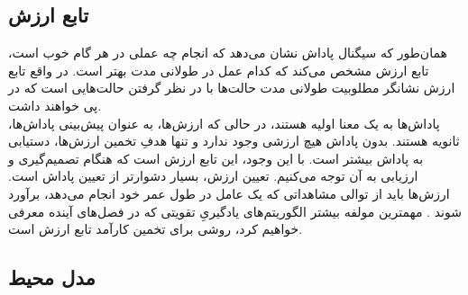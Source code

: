 
\subsection{تابع ارزش}
همان‌طور که سیگنال پاداش نشان می‌دهد که انجام چه عملی در هر گام خوب است، تابع ارزش مشخص می‌کند که کدام عمل در طولانی مدت بهتر است. در واقع تابع ارزش نشانگر مطلوبیت طولانی مدت حالت‌ها با در نظر گرفتن حالت‌هایی است که در پی خواهند داشت.
\\پاداش‌ها به یک معنا اولیه هستند، در حالی که ارزش‌ها، به عنوان پیش‌بینی پاداش‌ها، ثانویه هستند. بدون پاداش هیچ ارزشی وجود ندارد و تنها هدفِ تخمین ارزش‌ها، دستیابی به پاداش بیشتر است. با این وجود، این تابع ارزش است که هنگام تصمیم‌گیری و ارزیابی به آن توجه می‌کنیم.
تعیین ارزش،‌ بسیار دشوارتر از تعیین پاداش است.
ارزش‌ها باید از توالی مشاهداتی که یک عامل در طول عمر خود انجام می‌دهد، برآورد شوند
\cite{suttonbook}.
مهمترین مولفه بیشتر الگوریتم‌های یادگیریِ تقویتی که در  فصل‌های آینده معرفی خواهیم کرد، روشی برای تخمین کارآمد تابع ارزش است.

\subsection{مدل محیط}

